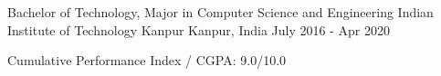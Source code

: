 

  \cventry
    {Bachelor of Technology, Major in Computer Science and Engineering}
    {Indian Institute of Technology Kanpur}
    {Kanpur, India}
    {July 2016 - Apr 2020}
    {
      \begin{cvitems}
        \item Cumulative Performance Index / CGPA: 9.0/10.0
      \end{cvitems}
    }

